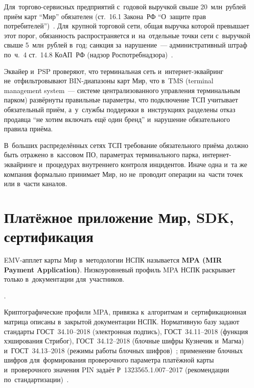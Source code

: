 Для~торгово-сервисных предприятий с~годовой выручкой свыше 20~млн~рублей
приём карт \enquote{Мир} обязателен (ст.~16.1 Закона~РФ \enquote{О~защите прав
потребителей})~\cite{zozpp,cbr-nps-faq}. Для~крупной торговой
сети, общая выручка которой превышает этот порог, обязанность распространяется
и~на~отдельные точки сети с~выручкой свыше 5~млн~рублей в~год; санкция
за~нарушение~--- административный штраф по~ч.~4 ст.~14.8 КоАП~РФ (надзор
Роспотребнадзора)~\cite{koap-rf}.

Эквайер и~PSP проверяют, что терминальная сеть и~интернет-эквайринг
не~отфильтровывают BIN-диапазоны карт Мир, что в~TMS (terminal management
system~--- системе централизованного управления терминальным парком) развёрнуты
правильные параметры, что подключение ТСП учитывает обязательный приём,
а~у~службы поддержки в~инструкциях разделены отказ продавца \enquote{не хотим
включать ещё один бренд} и~нарушение обязательного правила приёма.

В~больших распределённых сетях ТСП требование обязательного приёма должно
быть отражено в~кассовом ПО, параметрах терминального парка,
интернет-эквайринге и~процедурах внутреннего контроля инцидентов. Иначе одна
и~та же компания формально принимает Мир, но не~проводит операции на~части точек
или в~части каналов.

\section{Платёжное приложение Мир, SDK, сертификация}\label{sec:mir-certification}

EMV-апплет карты Мир в~методологии НСПК называется \textbf{MPA (MIR Payment
Application)}. Низкоуровневый профиль MPA НСПК раскрывает только
в~документации для~участников.

.

Криптографические профили MPA, привязка к~алгоритмам и~сертификационная матрица
описаны в~закрытой документации НСПК. Нормативную базу задают стандарты
ГОСТ~34.10--2018 (электронная подпись), ГОСТ~34.11--2018 (функция хэширования
Стрибог), ГОСТ~34.12--2018 (блочные шифры Кузнечик и~Магма) и~ГОСТ~34.13--2018
(режимы работы блочных
шифров)~\cite{gost-34-10,gost-34-11,gost-34-12,gost-34-13}; применение блочных
шифров для~формирования проверочного параметра платёжной карты и~проверочного
значения PIN задаёт Р~1323565.1.007--2017 (рекомендации по~стандартизации)~\cite{gost-1323565-1-007}.

